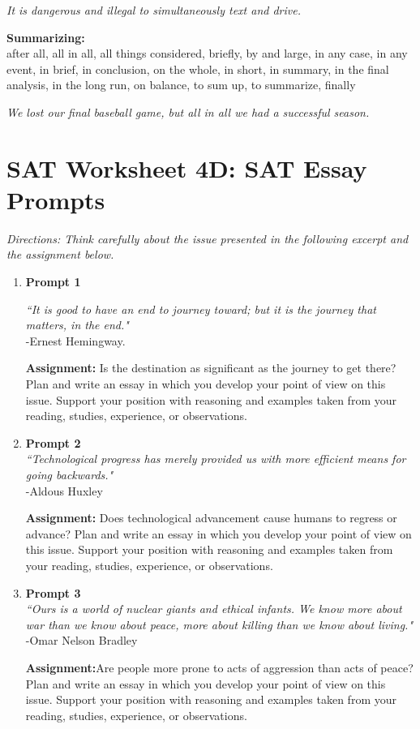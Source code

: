 \documentclass[12pt]{book}
\begin{document}
\bigskip
\textit{It is dangerous and illegal to simultaneously text and drive.}

\bigskip
\textbf{Summarizing:}\\
after all, all in all, all things considered, briefly, by and large, in any case, in any event, in brief, in conclusion, on the whole, in short, in summary, in the final analysis, in the long run, on balance, to sum up, to summarize, finally

\bigskip
\textit{We lost our final baseball game, but all in all we had a successful season.}

\pagebreak

\section[Essay Prompts]{SAT Worksheet 4D: SAT Essay Prompts}

\textit{Directions: Think carefully about the issue presented in the following excerpt and the assignment below.}

\begin{enumerate}
\item{\textbf{Prompt 1}}

\textit{``It is good to have an end to journey toward; but it is the journey that matters, in the end."}  \\ 
-Ernest Hemingway.

\bigskip
\textbf{Assignment:} Is the destination as significant as the journey to get there?  Plan and write an essay in which you develop your point of view on this issue.  Support your position with reasoning and examples taken from your reading, studies, experience, or observations.

\item{\textbf{Prompt 2}}\\
\textit{``Technological progress has merely provided us with more efficient means for going backwards."}\\
-Aldous Huxley

\bigskip
\textbf{Assignment:} Does technological advancement cause humans to regress or advance?  Plan and write an essay in which you develop your point of view on this issue.  Support your position with reasoning and examples taken from your reading, studies, experience, or observations.

\item{\textbf{Prompt 3}}\\
\textit{``Ours is a world of nuclear giants and ethical infants. We know more about war than we know about peace, more about killing than we know about living."}\\
-Omar Nelson Bradley

\bigskip
\textbf{Assignment:}Are people more prone to acts of aggression than acts of peace?  Plan and write an essay in which you develop your point of view on this issue.  Support your position with reasoning and examples taken from your reading, studies, experience, or observations.
\end{enumerate}
\end{document}
